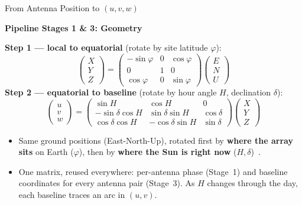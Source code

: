 \documentclass{beamer}
\newcounter{sframe}[section]
\renewcommand{\thesframe}{\thesection.\arabic{sframe}}
\newcommand{\ftitle}[1]{\stepcounter{sframe}{\normalsize\thesframe}\quad #1}
\begin{document}
\begin{frame}{\ftitle{From Antenna Position to $(u,v,w)$}}
\begin{flushright}
\scriptsize\colorbox{blue!12}{\textcolor{blue!55!black}{\textbf{Pipeline
Stages 1 \& 3: Geometry}}}
\end{flushright}
\vspace{-6pt}
\textbf{Step 1 --- local to equatorial} (rotate by site latitude $\varphi$):
\[
\begin{pmatrix}X\\Y\\Z\end{pmatrix} =
\begin{pmatrix}
-\sin\varphi & 0 & \cos\varphi\\
0 & 1 & 0\\
\cos\varphi & 0 & \sin\varphi
\end{pmatrix}
\begin{pmatrix}E\\N\\U\end{pmatrix}
\]
\textbf{Step 2 --- equatorial to baseline} (rotate by hour angle $H$,
declination $\delta$):
\[
\begin{pmatrix}u\\v\\w\end{pmatrix} =
\begin{pmatrix}
\sin H & \cos H & 0\\
-\sin\delta\cos H & \sin\delta\sin H & \cos\delta\\
\cos\delta\cos H & -\cos\delta\sin H & \sin\delta
\end{pmatrix}
\begin{pmatrix}X\\Y\\Z\end{pmatrix}
\]
\begin{itemize}
  \footnotesize
  \item Same ground positions (East-North-Up), rotated first by \textbf{where
  the array sits} on Earth ($\varphi$), then by \textbf{where the Sun is
  right now} ($H,\delta$)~\cite{tms2017}.
  \item[$\Rightarrow$] One matrix, reused everywhere: per-antenna phase
  (Stage~1) and baseline coordinates for every antenna pair (Stage~3). As
  $H$ changes through the day, each baseline traces an arc in $(u,v)$.
\end{itemize}
\end{frame}
\end{document}
